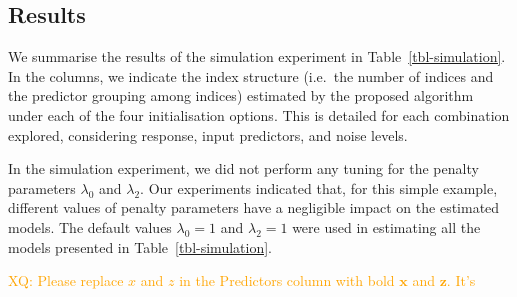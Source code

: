 \documentclass[11pt,a4paper,]{article}
\begin{document}
\hypertarget{sec-sim-results}{%
\subsection{Results}\label{sec-sim-results}}

We summarise the results of the simulation experiment in
Table~\ref{tbl-simulation}. In the columns, we indicate the index
structure (i.e.~the number of indices and the predictor grouping among
indices) estimated by the proposed algorithm under each of the four
initialisation options. This is detailed for each combination explored,
considering response, input predictors, and noise levels.

In the simulation experiment, we did not perform any tuning for the
penalty parameters \(\lambda_{0}\) and \(\lambda_{2}\). Our experiments
indicated that, for this simple example, different values of penalty
parameters have a negligible impact on the estimated models. The default
values \(\lambda_{0} = 1\) and \(\lambda_{2} = 1\) were used in
estimating all the models presented in Table~\ref{tbl-simulation}.

\textcolor{orange}{XQ: Please replace $x$ and $z$ in the Predictors column with bold $\bm{x}$ and $\bm{z}$. It's}
\end{document}
